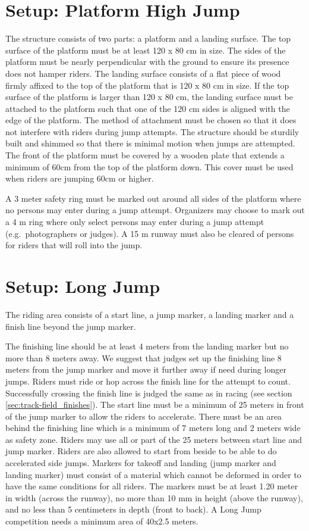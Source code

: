 \section{Setup: Platform High Jump}
The structure consists of two parts: a platform and a landing surface.
The top surface of the platform must be at least 120 x 80 cm in size.
The sides of the platform must be nearly perpendicular with the ground to ensure its presence does not hamper riders.
The landing surface consists of a flat piece of wood firmly affixed to the top of the platform that is 120 x 80 cm in size.
If the top surface of the platform is larger than 120 x 80 cm, the landing surface must be attached to the platform such that one of the 120 cm sides is aligned with the edge of the platform.
The method of attachment must be chosen so that it does not interfere with riders during jump attempts.
The structure should be sturdily built and shimmed so that there is minimal motion when jumps are attempted.
The front of the platform must be covered by a wooden plate that extends a minimum of 60cm from the top of the platform down.
This cover must be used when riders are jumping 60cm or higher.

A 3 meter safety ring must be marked out around all sides of the platform where no persons may enter during a jump attempt.
Organizers may choose to mark out a 4 m ring where only select persons may enter during a jump attempt (e.g.\ photographers or judges).
A 15 m runway must also be cleared of persons for riders that will roll into the jump.

\section{Setup: Long Jump}
The riding area consists of a start line, a jump marker, a landing marker and a finish line beyond the jump marker.

The finishing line should be at least 4 meters from the landing marker but no more than 8 meters away.
We suggest that judges set up the finishing line 8 meters from the jump marker and move it further away if need during longer jumps.
Riders must ride or hop across the finish line for the attempt to count.
Successfully crossing the finish line is judged the same as in racing (see section \ref{sec:track-field_finishes}).
The start line must be a minimum of 25 meters in front of the jump marker to allow the riders to accelerate.
There must be an area behind the finishing line which is a minimum of 7 meters long and 2 meters wide as safety zone.
Riders may use all or part of the 25 meters between start line and jump marker.
Riders are also allowed to start from beside to be able to do accelerated side jumps.
Markers for takeoff and landing (jump marker and landing marker) must consist of a material which cannot be deformed in order to have the same conditions for all riders.
The markers must be at least 1.20 meter in width (across the runway), no more than 10 mm in height (above the runway), and no less than 5 centimeters in depth (front to back).
A Long Jump competition needs a minimum area of 40x2.5 meters.


